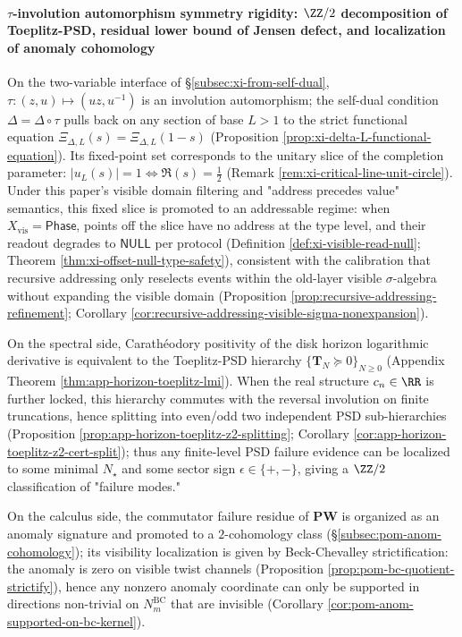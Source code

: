 \paragraph{\texorpdfstring{$\tau$}{tau}-involution automorphism symmetry rigidity: \texorpdfstring{$\ZZ/2$}{Z/2} decomposition of Toeplitz-PSD, residual lower bound of Jensen defect, and localization of anomaly cohomology}
On the two-variable interface of \S\ref{subsec:xi-from-self-dual}, \(\tau:(z,u)\mapsto(uz,u^{-1})\) is an involution automorphism;
the self-dual condition \(\Delta=\Delta\circ\tau\) pulls back on any section of base \(L>1\) to the strict functional equation \(\Xi_{\Delta,L}(s)=\Xi_{\Delta,L}(1-s)\) (Proposition \ref{prop:xi-delta-L-functional-equation}).
Its fixed-point set corresponds to the unitary slice of the completion parameter: \(|u_L(s)|=1\iff \Re(s)=\tfrac12\) (Remark \ref{rem:xi-critical-line-unit-circle}).
Under this paper's visible domain filtering and "address precedes value" semantics, this fixed slice is promoted to an addressable regime: when \(X_{\mathrm{vis}}=\mathsf{Phase}\), points off the slice have no address at the type level, and their readout degrades to \(\mathsf{NULL}\) per protocol (Definition \ref{def:xi-visible-read-null}; Theorem \ref{thm:xi-offset-null-type-safety}), consistent with the calibration that recursive addressing only reselects events within the old-layer visible \(\sigma\)-algebra without expanding the visible domain (Proposition \ref{prop:recursive-addressing-refinement}; Corollary \ref{cor:recursive-addressing-visible-sigma-nonexpansion}).
\par
On the spectral side, Carathéodory positivity of the disk horizon logarithmic derivative is equivalent to the Toeplitz-PSD hierarchy \(\{\mathbf{T}_N\succeq 0\}_{N\ge 0}\) (Appendix Theorem \ref{thm:app-horizon-toeplitz-lmi}).
When the real structure \(c_n\in\RR\) is further locked, this hierarchy commutes with the reversal involution on finite truncations, hence splitting into even/odd two independent PSD sub-hierarchies (Proposition \ref{prop:app-horizon-toeplitz-z2-splitting}; Corollary \ref{cor:app-horizon-toeplitz-z2-cert-split});
thus any finite-level PSD failure evidence can be localized to some minimal \(N_\star\) and some sector sign \(\epsilon\in\{+,-\}\), giving a \(\ZZ/2\) classification of "failure modes."
\par
On the calculus side, the commutator failure residue of \(\mathbf{PW}\) is organized as an anomaly signature and promoted to a \(2\)-cohomology class (\S\ref{subsec:pom-anom-cohomology});
its visibility localization is given by Beck-Chevalley strictification: the anomaly is zero on visible twist channels (Proposition \ref{prop:pom-bc-quotient-strictify}), hence any nonzero anomaly coordinate can only be supported in directions non-trivial on \(N^{\mathrm{BC}}_m\) that are invisible (Corollary \ref{cor:pom-anom-supported-on-bc-kernel}).
